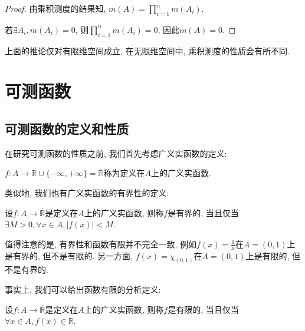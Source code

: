 \documentclass[theorem=false,mathfont=none,openany,sub3section]{easybook}
\newcommand{\btocgroup}[1][toc]{\addtocontents{#1}{\string\begingroup}}
\newcommand{\etocgroup}[1][toc]{\addtocontents{#1}{\string\endgroup}}
\begin{document}
\begin{proof}
  由乘积测度的结果知, $m(A)=\prod_{i=1}^{n}m(A_i)$.\par
  若$\exists A_i, m(A_i)=0$, 则$\prod_{i=1}^{n}m(A_i)=0$, 因此$m(A)=0$.\par
\end{proof}

\begin{remark}
  上面的推论仅对有限维空间成立, 在无限维空间中, 乘积测度的性质会有所不同.\par
\end{remark}

\btocgroup
{}
\chapter{可测函数}
\etocgroup

\section{可测函数的定义和性质}

在研究可测函数的性质之前, 我们首先考虑广义实函数的定义:\par

\begin{definition}
  $f:A\rightarrow \mathbb{R}\cup\{-\infty,+\infty\}=\overline{\mathbb{R} }$称为定义在$A$上的广义实函数.\par
\end{definition}

类似地, 我们也有广义实函数的有界性的定义:\par

\begin{definition}
  设$f:A\rightarrow \overline{\mathbb{R} }$是定义在$A$上的广义实函数, 则称$f$是有界的, 当且仅当$\exists M>0, \forall x\in A, |f(x)|<M$.\par
\end{definition}

\begin{remark}
  值得注意的是, 有界性和函数有限并不完全一致, 例如$f(x)=\frac{1}{x}$在$A=(0,1)$上是有界的, 但不是有限的. 另一方面, $f(x)=\chi_{(0,1)}$在$A=(0,1)$上是有限的, 但不是有界的.\par
\end{remark}

事实上, 我们可以给出函数有限的分析定义:\par

\begin{definition}
  设$f:A\rightarrow \overline{\mathbb{R} }$是定义在$A$上的广义实函数, 则称$f$是有限的, 当且仅当$\forall x\in A, f(x)\in \mathbb{R}$.\par
\end{definition}
\end{document}
